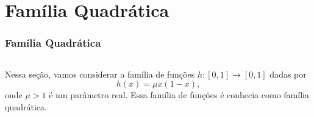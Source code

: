 \section{Família Quadrática}

\begin{frame}
\vspace{5pt}
\frametitle{Família Quadrática}
\begin{columns}
\column{0.5\dimexpr\paperwidth-15pt}

Nessa seção, vamos considerar a família de funções $h: [0, 1] \to [0, 1]$ dadas por
$$h(x) = \mu x(1-x),$$
onde $\mu > 1$ é um parâmetro real.
Essa família de funções é conhecia como família quadrática.

\column{0.5\dimexpr\paperwidth-15pt}



\end{columns}
\end{frame}

